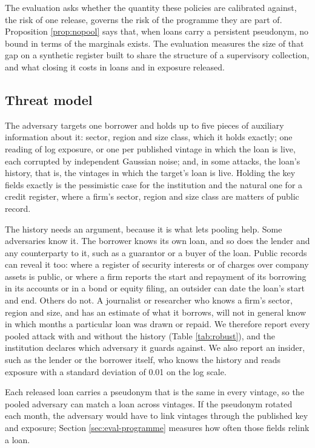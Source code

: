 \documentclass[11pt,a4paper]{article}
\theoremstyle{plain}
\theoremstyle{definition}
\theoremstyle{definition}
\theoremstyle{plain}
\begin{document}
The evaluation asks whether the quantity these policies are calibrated against,
the risk of one release, governs the risk of the programme they are part of.
Proposition \ref{prop:nopool} says that, when loans carry a persistent
pseudonym, no bound in terms of the marginals exists. The evaluation measures the size of that gap on a synthetic register
built to share the structure of a supervisory collection, and what closing it
costs in loans and in exposure released.

\subsection{Threat model}\label{sec:eval-threat}

The adversary targets one borrower and holds up to five pieces of auxiliary
information about it: sector, region and size class, which it holds exactly; one
reading of log exposure, or one per published vintage in which the loan is live,
each corrupted by independent Gaussian noise; and, in some attacks, the loan's
history, that is, the vintages in which the target's loan is live. Holding the key
fields exactly is the pessimistic case for the institution and the natural one for
a credit register, where a firm's sector, region and size class are matters of
public record.

The history needs an argument, because it is what lets pooling help. Some
adversaries know it. The borrower knows its own loan, and so does the lender and
any counterparty to it, such as a guarantor or a buyer of the loan. Public records
can reveal it too: where a register of security interests or of charges over
company assets is public, or where a firm reports the start and repayment of its
borrowing in its accounts or in a bond or equity filing, an outsider can date the
loan's start and end. Others do not. A journalist or researcher who knows a firm's
sector, region and size, and has an estimate of what it borrows, will not in
general know in which months a particular loan was drawn or repaid. We therefore
report every pooled attack with and without the history (Table \ref{tab:robust}),
and the institution declares which adversary it guards against. We also report
an insider, such as the lender or the borrower itself, who knows the history and
reads exposure with a standard deviation of 0.01 on the log scale.

Each released loan carries a pseudonym that is the same in every vintage, so the
pooled adversary can match a loan across vintages. If the pseudonym rotated each
month, the adversary would have to link vintages through the published key and
exposure; Section \ref{sec:eval-programme} measures how often those fields
relink a loan.
\end{document}
